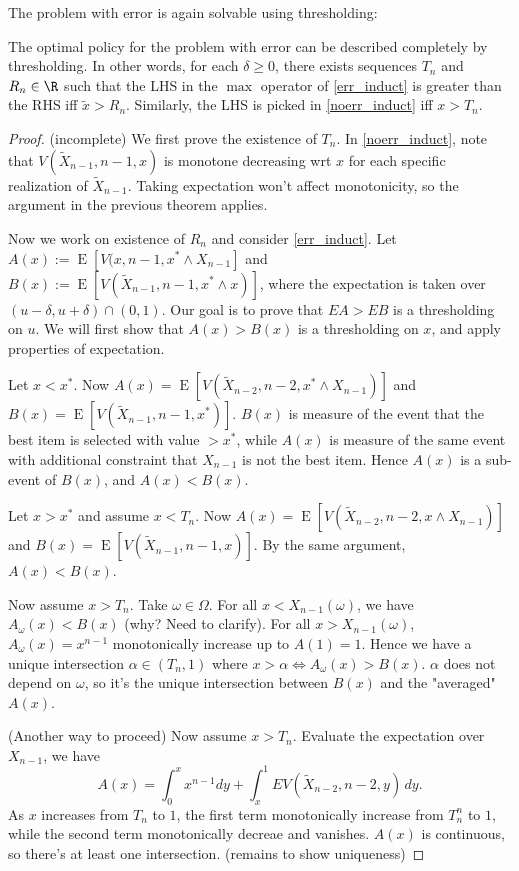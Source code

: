 The problem with error is again solvable using thresholding:
\begin{theorem}
	The optimal policy for the problem with error can be described completely by thresholding. In other words, for each $\delta \ge 0$, there exists sequences $T_n$ and $R_n \in \R$ such that the LHS in the $\max$ operator of \eqref{err_induct} is greater than the RHS iff $\tilde x > R_n$. Similarly, the LHS is picked in \eqref{noerr_induct} iff $x > T_n$.
\end{theorem}
\begin{proof}
	(incomplete) We first prove the existence of $T_{n}$. In \eqref{noerr_induct}, note that $ V(\tilde X_{n-1}, n-1, x)$ is monotone decreasing wrt $x$ for each specific realization of $\tilde X_{n-1}$. Taking expectation won't affect monotonicity, so the argument in the previous theorem applies.  
	
	Now we work on existence of $R_{n}$ and consider \eqref{err_induct}. Let $A(x) := \operatorname{E}\left[{V(x, n-1, x^* \wedge X_{n-1}}\right]$ and $B(x):= \operatorname{E}\left[{V(\tilde X_{n-1}, n-1, x^* \wedge x)}\right]$, where the expectation is taken over $(u-\delta, u+\delta)\cap (0,1)$. Our goal is to prove that $EA > EB$ is a thresholding on $u$. We will first show that $A(x)>B(x)$ is a thresholding on $x$, and apply properties of expectation.
	
	Let $x < x^*$. Now $A(x) = \operatorname{E}\left[{V\left( \tilde X_{n-2}, n-2, x^* \wedge X_{n-1} \right) }\right]$ and $B(x) = \operatorname{E}\left[{V\left( \tilde X_{n-1}, n-1, x^* \right) }\right]$. $B(x)$ is measure of the event that the best item is selected with value $>x^*$, while $A(x)$ is measure of the same event with additional constraint that $X_{n-1}$ is not the best item. Hence $A(x)$ is a sub-event of $B(x)$, and $A(x) < B(x)$.

	Let $x > x^*$ and assume $x < T_{n}$. Now $A(x) = \operatorname{E}\left[{V\left( \tilde X_{n-2}, n-2, x \wedge X_{n-1} \right) }\right]$ and $B(x) = \operatorname{E}\left[{V\left( \tilde X_{n-1}, n-1, x \right) }\right]$. By the same argument, $A(x) < B(x)$.
	
	Now assume $x > T_{n}$. Take $\omega \in \Omega$. For all $x < X_{n-1}(\omega)$, we have $A_\omega(x) < B(x)$ (why? Need to clarify). For all $x > X_{n-1}(\omega)$, $A_\omega(x) = x^{n-1}$  monotonically increase up to $A(1) = 1$. Hence we have a unique intersection  $\alpha \in (T_{n}, 1)$ where $x > \alpha \iff A_\omega(x) > B(x)$. $\alpha$ does not depend on $\omega$, so it's the unique intersection between $B(x)$ and the "averaged"  $A(x)$.

	(Another way to proceed) Now assume $x > T_{n}$. Evaluate the expectation over $X_{n-1}$, we have \[
	A(x) = \int_0^x x^{n-1} dy + \int_x^1 EV(\tilde X_{n-2}, n-2, y) \, dy
	.\] 
	As $x$ increases from $T_{n}$ to $1$, the first term monotonically increase from $T_{n}^n$ to $1$, while the second term monotonically decreae and vanishes. $A(x)$ is continuous, so there's at least one intersection. (remains to show uniqueness)
\end{proof}

